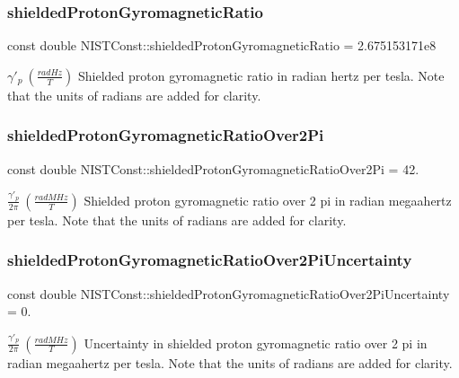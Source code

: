 \subsubsection{\texorpdfstring{shielded\+Proton\+Gyromagnetic\+Ratio}{shieldedProtonGyromagneticRatio}}
{\footnotesize\ttfamily const double N\+I\+S\+T\+Const\+::shielded\+Proton\+Gyromagnetic\+Ratio = 2.\+675153171e8}

$\gamma'_p \ (\frac{rad Hz}{T})$ Shielded proton gyromagnetic ratio in radian hertz per tesla. Note that the units of radians are added for clarity. \mbox{\label{group___proton_ga5b2d223ede8fc141af04cef0486c2c52}} 
\subsubsection{\texorpdfstring{shielded\+Proton\+Gyromagnetic\+Ratio\+Over2\+Pi}{shieldedProtonGyromagneticRatioOver2Pi}}
{\footnotesize\ttfamily const double N\+I\+S\+T\+Const\+::shielded\+Proton\+Gyromagnetic\+Ratio\+Over2\+Pi = 42.}

$\frac{\gamma'_p}{2 \pi} \ (\frac{rad MHz}{T})$ Shielded proton gyromagnetic ratio over 2 pi in radian megaahertz per tesla. Note that the units of radians are added for clarity. \mbox{\label{group___proton_ga8a726ae1ce4a083a50cd2bb5c446cf15}} 
\subsubsection{\texorpdfstring{shielded\+Proton\+Gyromagnetic\+Ratio\+Over2\+Pi\+Uncertainty}{shieldedProtonGyromagneticRatioOver2PiUncertainty}}
{\footnotesize\ttfamily const double N\+I\+S\+T\+Const\+::shielded\+Proton\+Gyromagnetic\+Ratio\+Over2\+Pi\+Uncertainty = 0.}

$\frac{\gamma'_p}{2 \pi} \ (\frac{rad MHz}{T})$ Uncertainty in shielded proton gyromagnetic ratio over 2 pi in radian megaahertz per tesla. Note that the units of radians are added for clarity. \mbox{\label{group___proton_gae603375639410bab3920a82ad88e22b8}} 

